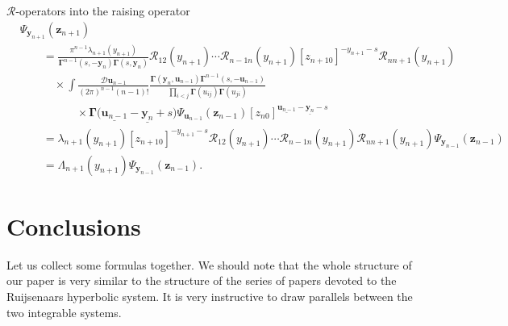 \documentclass[10pt,a4paper]{amsart}
\numberwithin{equation}{section}
\begin{document}
$\mathcal{R}$-operators into the raising operator
\begin{align*}
&
\Psi_{\bm{y}_{n+1}}(\bm{z}_{n+1}) \\
& \qquad =
\frac{\pi^{n-1} \lambda_{n+1}(y_{n+1})}
{\mathbf{\Gamma}^{n-1}(s ,-\bm{y}_{n})
\mathbf{\Gamma}(s ,\bm{y}_{n})}
\mathcal{R}_{12}(y_{n+1})\cdots
\mathcal{R}_{n-1 n}(y_{n+1})
[z_{n+1 0}]^{-y_{n+1}-s} \mathcal{R}_{n n+1}(y_{n+1})\\
& \qquad\quad \times
\int \frac{\mathcal{D}\bm{u}_{n-1}}
{(2\pi)^{n-1} (n-1)!}
\frac{\mathbf{\Gamma}(\bm y_{n},\bm u_{n-1})
\mathbf{\Gamma}^{n-1}(s ,-\bm{u}_{n-1})}
{\prod\limits_{i<j}\mathbf{\Gamma}(u_{ij})\mathbf{\Gamma}(u_{ji})} \\
& \qquad\qquad\quad \times
\mathbf{\Gamma}\bigl(\underline{\bm{u}_{n-1}}-\underline{\bm{y}_{n}}+s\bigr)
\Psi_{\bm{u}_{n-1}}(\bm{z}_{n-1})
[z_{n 0}]^{\underline{\bm{u}_{n-1}}-
\underline{\bm{y}_{n}}-s} \\
& \qquad =
\lambda_{n+1}(y_{n+1})
[z_{n+1 0}]^{-y_{n+1}-s}
\mathcal{R}_{12}(y_{n+1})\cdots
\mathcal{R}_{n-1 n}(y_{n+1}) \mathcal{R}_{n n+1}(y_{n+1})
\Psi_{\bm{y}_{n-1}}(\bm{z}_{n-1}) \\
& \qquad =
\Lambda_{n+1}(y_{n+1}) \Psi_{\bm{y}_{n-1}}(\bm{z}_{n-1}) .
\end{align*}



\section{Conclusions}
\label{con}

Let us collect some formulas together.
We should note that the whole structure of our paper
is very similar to the structure of the series of
papers \cite{BDKK1,BDKK2,BDKK3,BDKK4} devoted to
the Ruijsenaars hyperbolic system.
It is very instructive to draw parallels between the two integrable systems.
\end{document}
